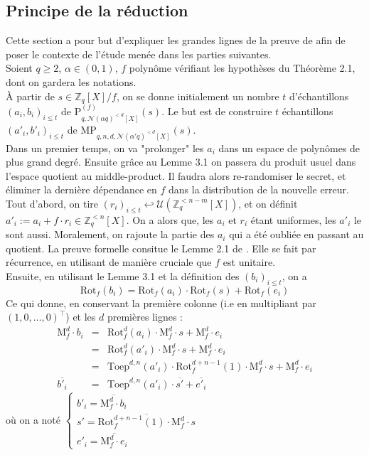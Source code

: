 \documentclass[11pt,a4paper]{article}
\begin{document}
\subsection{Principe de la réduction}
Cette section a pour but d'expliquer les grandes lignes de la preuve de \cite{mplwe} afin de poser le contexte de l'étude menée dans les parties suivantes. \\

Soient $q \geq 2$, $\alpha \in (0,1)$, $f$ polynôme vérifiant les hypothèses du Théorème 2.1, dont on gardera les notations. \\
 À partir de $s\in \mathbb{Z}_q[X]/f$, on se donne initialement un nombre $t$ d'échantillons $(a_i,b_i)_{i\leq t}$ de $\text{P}^{(f)}_{q,\mathcal{N}(\alpha q)^{<d}[X]}(s)$. Le but est de construire $t$ échantillons $(a'_i,b'_i)_{i\leq t}$ de $\text{MP}_{q,n,d,\mathcal{N}(\alpha' q)^{<d}[X]}(s)$. \\ 
 Dans un premier temps, on va "prolonger" les $a_i$ dans un espace de polynômes de plus grand degré. Ensuite grâce au Lemme 3.1 on passera du produit usuel dans l'espace quotient au middle-product. Il faudra alors re-randomiser le secret, et éliminer la dernière dépendance en $f$ dans la distribution de la nouvelle erreur. \\

Tout d'abord, on tire $(r_i)_{i\leq t} \hookleftarrow \mathcal{U}(\mathbb{Z}_q^{<n-m}[X])$, et on définit $a'_i := a_i + f\cdot r_i \in \mathbb{Z}_q^{<n}[X]$. On a alors que, les $a_i$ et $r_i$ étant uniformes, les $a'_i$ le sont aussi. Moralement, on rajoute la partie des $a_i$ qui a été oubliée en passant au quotient. La preuve formelle consitue le Lemme 2.1 de \cite{psis}. Elle se fait par récurrence, en utilisant de manière cruciale que $f$ est unitaire. \\

Ensuite, en utilisant le Lemme 3.1 et la définition des $(b_i)_{i\leq t}$, on a 
\[\text{Rot}_f(b_i)=\text{Rot}_f(a_i)\cdot\text{Rot}_f(s)+\text{Rot}_f(e_i)\]
Ce qui donne, en conservant la première colonne (i.e en multipliant par $(1,0,\dots,0)^\top$) et les $d$ premières lignes :
\begin{eqnarray*}
\text{M}_f^d\cdot b_i &=& \text{Rot}_f^d(a_i)\cdot\text{M}_f^d\cdot s +\text{M}_f^d\cdot e_i \\
&=& \text{Rot}_f^d(a'_i)\cdot\text{M}_f^d\cdot s +\text{M}_f^d\cdot e_i  \\
&=& \text{Toep}^{d,n}(a'_i)\cdot\text{Rot}^{d+n-1}_f(1)\cdot\text{M}_f^d\cdot s +\text{M}_f^d\cdot e_i  \\
\overline{b'_i}&=& \text{Toep}^{d,n}(a'_i)\cdot\overline{s'} + \overline{e'_i}
\end{eqnarray*}
où on a noté $\begin{cases} b'_i = \overline{\text{M}_f^d\cdot b_i} \\ s' = \overline{\text{Rot}^{d+n-1}_f(1)\cdot\text{M}_f^d\cdot s} \\ e'_i = \overline{\text{M}_f^d\cdot e_i} \end{cases}$ \\
\end{document}
